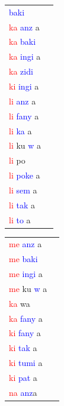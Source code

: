 \documentclass[output=paper,colorlinks,citecolor=brown,
]{langscibook}
\begin{document}
\begin{table}
\lsptoprule
\begin{minipage}[t]{.24\textwidth}
\begin{tabular}{ll} 
\textcolor{blue}{baki} \\ 
\textcolor{red}{ka} \textcolor{blue}{anz} a \\ 
\textcolor{red}{ka} \textcolor{blue}{baki} \\ 
\textcolor{red}{ka} \textcolor{blue}{ingi} a \\ 
\textcolor{red}{ka} \textcolor{blue}{zidi} \\ 
\textcolor{red}{ki} \textcolor{blue}{ingi} a \\ 
\textcolor{red}{li} \textcolor{blue}{anz} a \\ 
\textcolor{red}{li} \textcolor{blue}{fany} a \\
\textcolor{red}{li} \textcolor{blue}{ka} a \\
\textcolor{red}{li} ku \textcolor{blue}{w} a\\
\textcolor{red}{li} po \\ 
\textcolor{red}{li} \textcolor{blue}{poke} a \\ 
\textcolor{red}{li} \textcolor{blue}{sem} a \\
\textcolor{red}{li} \textcolor{blue}{tak} a \\ 
\textcolor{red}{li} \textcolor{blue}{to} a \\
\end{tabular}
\end{minipage}
\begin{minipage}[t]{.24\textwidth}
\begin{tabular}{ll} 
\textcolor{red}{me} \textcolor{blue}{anz} a \\ 
\textcolor{red}{me} \textcolor{blue}{baki} \\ 
\textcolor{red}{me} \textcolor{blue}{ingi} a \\ 
\textcolor{red}{me} ku \textcolor{blue}{w} a \\ 
\textcolor{red}{ka} wa \\ 
\textcolor{red}{ka} \textcolor{blue}{fany} a \\ 
\textcolor{red}{ki} \textcolor{blue}{fany} a \\ 
\textcolor{red}{ki} \textcolor{blue}{tak} a \\ 
\textcolor{red}{ki} \textcolor{blue}{tumi} a \\ 
\textcolor{red}{ki} \textcolor{blue}{pat} a \\ 
\textcolor{red}{na} \textcolor{blue}{anz}a \\ 

\end{tabular}
\end{minipage}
\end{table}
\end{document}
